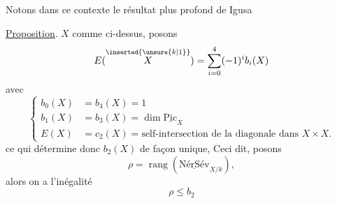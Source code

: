 Notons dans ce contexte le résultat plus profond de Igusa

\uline{Proposition}. $X$ comme ci-dessus,  posons
\[
E(\overset{\inserted{\unsure{k|1}}}{X})=\sum_{i=0}^{4}(-1)^i b_i(X)
\]
avec
\[
\left\{\begin{aligned}
b_0(X)&=b_4(X)=1\\
b_1(X)&=b_3(X)=\dim\underline{\mathrm{Pic}}_X\\
E(X)&=c_2(X)=\text{self-intersection de la diagonale dans } X\times X.
\end{aligned}\right.
\]
ce qui détermine donc $b_2(X)$ de façon unique,  Ceci dit, posons
\[
\rho=\operatorname{rang}(\underline{\text{NérSév}}_{X/k}),
\]
alors on a l'inégalité
\[
\boxed{\rho\leq b_2}
\]

